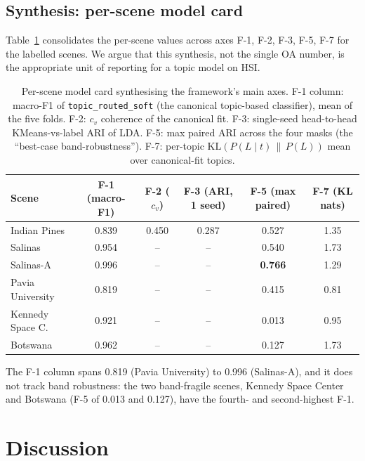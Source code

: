\documentclass[journal,a4paper,10pt]{IEEEtran}
\begin{document}
\subsection{Synthesis: per-scene model card}

Table~\ref{tab:summary} consolidates the per-scene values across
axes F-1, F-2, F-3, F-5, F-7 for the labelled scenes. We argue that this
synthesis, not the single OA number, is the appropriate unit of
reporting for a topic model on HSI.

\begin{table}[t]
\caption{Per-scene model card synthesising the framework's main
axes. F-1 column: macro-F1 of \texttt{topic\_routed\_soft} (the
canonical topic-based classifier), mean of the five folds.
F-2: $c_v$ coherence of the canonical fit. F-3: single-seed
head-to-head KMeans-vs-label ARI of LDA. F-5: max paired ARI across the four masks (the
``best-case band-robustness''). F-7: per-topic
$\mathrm{KL}(P(L\mid t) \,\|\, P(L))$ mean over canonical-fit topics.}
\label{tab:summary}
\centering
\small
\begin{tabular}{lccccc}
\toprule
Scene & F-1 (macro-F1) & F-2 ($c_v$) & F-3 (ARI, 1 seed) & F-5 (max paired) & F-7 (KL nats) \\
\midrule
Indian Pines     & 0.839 & 0.450 & 0.287    & 0.527 & 1.35 \\
Salinas          & 0.954 & --    & --       & 0.540 & 1.73 \\
Salinas-A        & 0.996 & --    & --       & \textbf{0.766} & 1.29 \\
Pavia University & 0.819 & --    & --       & 0.415 & 0.81 \\
Kennedy Space C. & 0.921 & --    & --       & 0.013 & 0.95 \\
Botswana         & 0.962 & --    & --       & 0.127 & 1.73 \\
\bottomrule
\end{tabular}
\end{table}

The F-1 column spans 0.819 (Pavia University) to 0.996 (Salinas-A),
and it does not track band robustness: the two band-fragile scenes,
Kennedy Space Center and Botswana (F-5 of 0.013 and 0.127), have the
fourth- and second-highest F-1.

\section{Discussion}
\label{sec:discuss}
\end{document}
